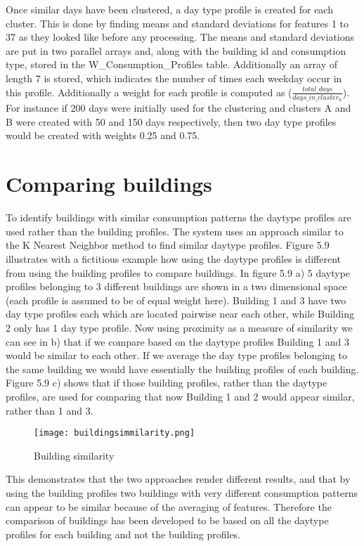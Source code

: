Once similar days have been clustered, a day type profile is created for each cluster. This is done by finding means and standard deviations for features 1 to 37 as they looked like before any processing. The means and standard deviations are put in two parallel arrays and, along with the building id and consumption type, stored in the W\_Consumption\_Profiles table. Additionally an array of length 7 is stored, which indicates the number of times each weekday occur in this profile. Additionally a weight for each profile is computed as ($\frac{total\_days}{days\_in\_cluster_n}$). For instance if 200 days were initially used for the clustering and clusters A and B were created with 50 and 150 days respectively, then two day type profiles would be created with weights 0.25 and 0.75.
\section{Comparing buildings}
To identify buildings with similar consumption patterns the daytype profiles are used rather than the building profiles. The system uses an approach similar to the K Nearest Neighbor method to find similar daytype profiles. Figure 5.9 illustrates with a fictitious example how using the daytype profiles is different from using the building profiles to compare buildings. In figure 5.9 a) 5 daytype profiles belonging to 3 different buildings are shown in a two dimensional space (each profile is assumed to be of equal weight here). Building 1 and 3 have two day type profiles each which are located pairwise near each other, while Building 2 only has 1 day type profile. Now using proximity as a measure of similarity we can see in b) that if we compare based on the daytype profiles Building 1 and 3 would be similar to each other. If we average the day type profiles belonging to the same building we would have essentially the building profiles of each building. Figure 5.9 c) shows that if those building profiles, rather than the daytype profiles, are used for comparing that now Building 1 and 2 would appear similar, rather than 1 and 3. 
\begin{figure}
\begin{center}
\texttt{[image: buildingsimmilarity.png]}
\end{center}
\caption{Building similarity}
\end{figure}
This demonstrates that the two approaches render different results, and that by using the building profiles two buildings with very different consumption patterns can appear to be similar because of the averaging of features. Therefore the comparison of buildings has been developed to be based on all the daytype profiles for each building and not the building profiles.

